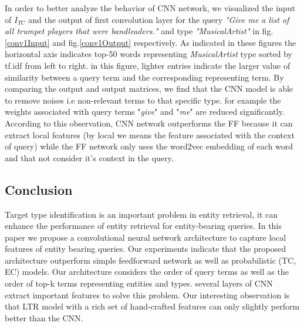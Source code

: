 In order to better analyze the behavior of CNN network, we visualized the input of $I_{TC}$ and the output of first convolution layer for the query \textit{"Give me a list of all trumpet players that were bandleaders."} and type \textit{"MusicalArtist"} in fig.\ref{conv1Input} and fig.\ref{conv1Output} respectively. As indicated in these figures the horizontal axis indicates top-50 words representing \textit{MusicalArtist} type sorted by tf.idf from left to right. in this figure, lighter entries indicate the larger value of similarity between a query term and the corresponding representing term. By comparing the output and output matrices, we find that the CNN model is able to remove noises i.e non-relevant terms to that specific type. for example the weights associated with query terms "\textit{give}" and "\textit{me}" are reduced significantly. According to this observation, CNN network outperforms the FF because it can extract local features (by local we means the feature associated with the context of query) while the FF network only uses the word2vec embedding of each word and that not consider it's context in the query.





\subsection{Conclusion}
Target type identification is an important problem in entity retrieval, it can enhance the performance of entity retrieval for entity-bearing queries. In this paper we propose a convolutional neural network architecture to capture local features of entity bearing queries. Our experiments indicate that the proposed architecture outperform simple feedforward network as well as probabilistic (TC, EC) models. Our architecture considers the order of query terms as well as the order of top-k terms representing entities and types. several layers of CNN extract important features to solve this problem. Our interesting observation is that LTR model with a rich set of hand-crafted features can only slightly perform better than the CNN.

